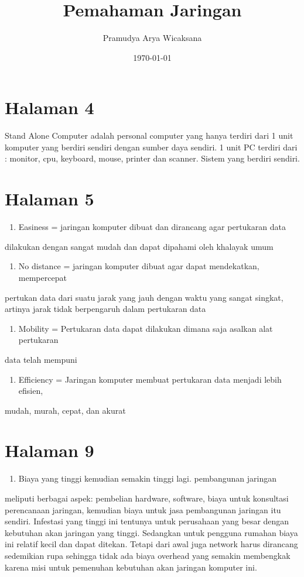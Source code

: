 \documentclass[11pt]{article}
\author{Pramudya Arya Wicaksana}
\date{\today}
\title{Pemahaman Jaringan}
\begin{document}
\maketitle

\section{Halaman 4}
\label{sec:org5ac5ebe}

Stand Alone Computer adalah personal computer yang hanya terdiri dari 1 unit
komputer yang berdiri sendiri dengan sumber daya sendiri. 1 unit PC terdiri
dari : monitor, cpu, keyboard, mouse, printer dan scanner. Sistem yang berdiri
sendiri.

\section{Halaman 5}
\label{sec:org9ad1800}

\begin{enumerate}
\item Easiness = jaringan komputer dibuat dan dirancang agar pertukaran data
\end{enumerate}
dilakukan dengan sangat mudah dan dapat dipahami oleh khalayak umum
\begin{enumerate}
\item No distance = jaringan komputer dibuat agar dapat mendekatkan, mempercepat
\end{enumerate}
pertukan data dari suatu jarak yang jauh dengan waktu yang sangat singkat, artinya
jarak tidak berpengaruh dalam pertukaran data
\begin{enumerate}
\item Mobility = Pertukaran data dapat dilakukan dimana saja asalkan alat pertukaran
\end{enumerate}
data telah mempuni
\begin{enumerate}
\item Efficiency = Jaringan komputer membuat pertukaran data menjadi lebih efisien,
\end{enumerate}
mudah, murah, cepat, dan akurat

\section{Halaman 9}
\label{sec:org89e5ac9}

\begin{enumerate}
\item Biaya yang tinggi kemudian semakin tinggi lagi. pembangunan jaringan
\end{enumerate}
meliputi berbagai aspek: pembelian hardware, software, biaya untuk
konsultasi perencanaan jaringan, kemudian biaya untuk jasa pembangunan
jaringan itu sendiri. Infestasi yang tinggi ini tentunya untuk perusahaan yang
besar dengan kebutuhan akan jaringan yang tinggi. Sedangkan untuk pengguna
rumahan biaya ini relatif kecil dan dapat ditekan. Tetapi dari awal juga network
harus dirancang sedemikian rupa sehingga tidak ada biaya overhead yang
semakin membengkak karena misi untuk pemenuhan kebutuhan akan jaringan
komputer ini.
\end{document}
